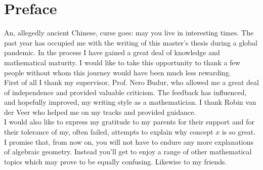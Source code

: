 \chapter*{Preface}
An, allegedly ancient Chinese, curse goes: may you live in interesting times.
The past year has occupied me with the writing of this master's thesis during a global pandemic.
In the process I have gained a great deal of knowledge and mathematical maturity.
I would like to take this opportunity to thank a few people without whom this journey would have been much less rewarding.\\

\noindent
First of all I thank my supervisor, Prof. Nero Budur, who allowed me a great deal of independence and provided valuable criticism.
The feedback has influenced, and hopefully improved, my writing style as a mathematician.
I thank Robin van der Veer who helped me on my tracks and provided guidance. \\

\noindent
I would also like to express my gratitude to my parents for their support and for their tolerance of my, often failed, attempts to explain why concept $x$ is so great.
I promise that, from now on, you will not have to endure any more explanations of algebraic geometry.
Instead you'll get to enjoy a range of other mathematical topics which may prove to be equally confusing. Likewise to my friends.
